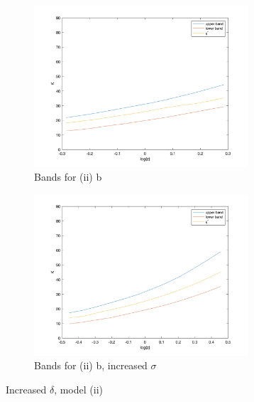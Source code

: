 \documentclass[10pt,letter]{article}
\begin{document}
\begin{center}
\begin{figure}
\begin{subfigure}{.5\textwidth}
\includegraphics[width=8cm]{ps3q2_fig23}
\caption{Bands for (ii) b}
\end{subfigure}
\begin{subfigure}{.5\textwidth}
\includegraphics[width=8cm]{ps3q2_fig24}
\caption{Bands for (ii) b, increased $\sigma$}
\end{subfigure}
\caption{Increased $\delta$, model (ii)}
\end{figure}
\end{center}
\end{document}
